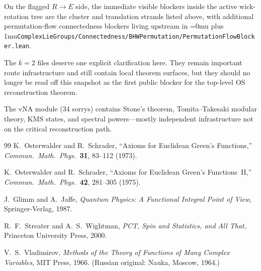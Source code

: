 \documentclass[11pt,a4paper]{article}
\newcommand{\leanfile}[1]{\begingroup\Urlmuskip=0mu plus 1mu\relax\nolinkurl{#1}\endgroup}
\begin{document}
\medskip\noindent
On the flagged $R \to E$ side, the immediate visible blockers inside the active
wick-rotation tree are the cluster and translation strands listed above, with
additional permutation-flow connectedness blockers living upstream in
\leanfile{ComplexLieGroups/Connectedness/BHWPermutation/PermutationFlowBlocker.lean}.

\medskip\noindent
The $k=2$ files deserve one explicit clarification here. They remain important
route infrastructure and still contain local theorem surfaces, but they should
no longer be read off this snapshot as the first public blocker for the
top-level OS reconstruction theorem.

The vNA module (34 sorrys) contains Stone's theorem, Tomita--Takesaki
modular theory, KMS states, and spectral powers---mostly independent
infrastructure not on the critical reconstruction path.


\begin{thebibliography}{99}
K.~Osterwalder and R.~Schrader,
``Axioms for Euclidean Green's Functions,''
\emph{Commun.\ Math.\ Phys.}\ \textbf{31}, 83--112 (1973).

K.~Osterwalder and R.~Schrader,
``Axioms for Euclidean Green's Functions~II,''
\emph{Commun.\ Math.\ Phys.}\ \textbf{42}, 281--305 (1975).

J.~Glimm and A.~Jaffe,
\emph{Quantum Physics: A Functional Integral Point of View},
Springer-Verlag, 1987.

R.~F.~Streater and A.~S.~Wightman,
\emph{PCT, Spin and Statistics, and All That},
Princeton University Press, 2000.

V.~S.~Vladimirov,
\emph{Methods of the Theory of Functions of Many Complex Variables},
MIT Press, 1966.
(Russian original: Nauka, Moscow, 1964.)
\end{thebibliography}
\end{document}

